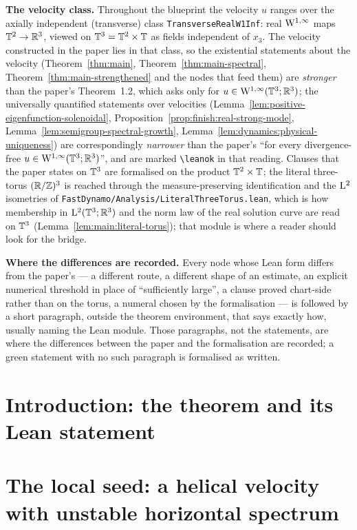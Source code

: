 \textbf{The velocity class.}  Throughout the blueprint the velocity $u$ ranges over the
axially independent (transverse) class \texttt{TransverseRealW1Inf}: real
$\mathrm{W}^{1,\infty}$ maps $\mathbb{T}^2\to\mathbb{R}^3$, viewed on $\mathbb{T}^3=\mathbb{T}^2\times\mathbb{T}$ as fields independent of
$x_3$.  The velocity constructed in the paper lies in that class, so the existential
statements about the velocity (Theorem~\ref{thm:main}, Theorem~\ref{thm:main-spectral},
Theorem~\ref{thm:main-strengthened} and the nodes that feed them) are \emph{stronger} than
the paper's Theorem~1.2, which asks only for $u\in\mathrm{W}^{1,\infty}(\mathbb{T}^3;\mathbb{R}^3)$; the universally
quantified statements over velocities (Lemma~\ref{lem:positive-eigenfunction-solenoidal},
Proposition~\ref{prop:finish:real-strong-mode}, Lemma~\ref{lem:semigroup-spectral-growth},
Lemma~\ref{lem:dynamics:physical-uniqueness}) are correspondingly \emph{narrower} than the
paper's ``for every divergence-free $u\in\mathrm{W}^{1,\infty}(\mathbb{T}^3;\mathbb{R}^3)$'', and are marked
\texttt{\textbackslash leanok} in that reading.  Clauses that the paper states on
$\mathbb{T}^3$ are formalised on the product $\mathbb{T}^2\times\mathbb{T}$; the literal three-torus
$(\mathbb{R}/\mathbb{Z})^3$ is reached through the measure-preserving identification and the $\mathrm{L}^2$
isometries of \texttt{FastDynamo/Analysis/LiteralThreeTorus.lean}, which is how membership in
$\mathrm{L}^2(\mathbb{T}^3;\mathbb{R}^3)$ and the norm law of the real solution curve are read on $\mathbb{T}^3$
(Lemma~\ref{lem:main:literal-torus}); that module is where a reader should look for the
bridge.

\textbf{Where the differences are recorded.}  Every node whose Lean form differs from the
paper's --- a different route, a different shape of an estimate, an explicit numerical
threshold in place of ``sufficiently large'', a clause proved chart-side rather than on the
torus, a numeral chosen by the formalisation --- is followed by a short paragraph, outside
the theorem environment, that says exactly how, usually naming the Lean module.  Those
paragraphs, not the statements, are where the differences between the paper and the
formalisation are recorded; a green statement with no such paragraph is formalised as
written.

\chapter{Introduction: the theorem and its Lean statement}


\chapter{The local seed: a helical velocity with unstable horizontal spectrum}


